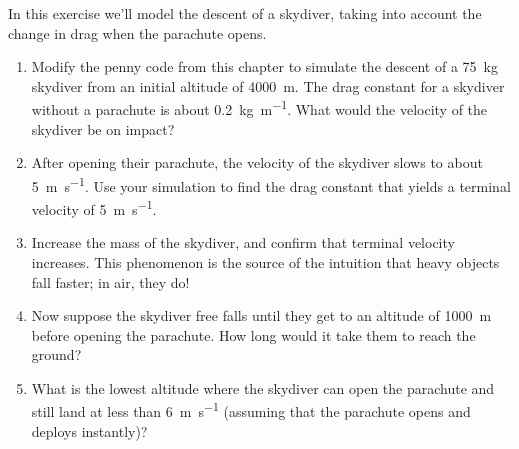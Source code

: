 \documentclass[../../book.tex]{subfiles}
\begin{document}
\begin{ex}

In this exercise we'll model the descent of a skydiver, taking into account the change in drag when the parachute opens.

\begin{enumerate}

\item Modify the penny code from this chapter to simulate the descent of a \SI{75}{\kilogram} skydiver from an initial altitude of \SI{4000}{\meter}.
The drag constant for a skydiver without a parachute is about \SI{0.2}{\kilogram \per \meter}.
What would the velocity of the skydiver be on impact?

\item After opening their parachute, the velocity of the skydiver slows to about \SI{5}{\meter\per\second}.  Use your simulation to find the drag constant that yields a terminal velocity of \SI{5}{\meter\per\second}.

\item Increase the mass of the skydiver, and confirm that terminal velocity increases.  This phenomenon is the source of the intuition that heavy objects fall faster; in air, they do!

\item Now suppose the skydiver free falls until they get to an altitude of \SI{1000}{\meter} before opening the parachute.  How long would it take them to reach the ground?

\item What is the lowest altitude where the skydiver can open the parachute and still land at less than \SI{6}{\meter\per\second} (assuming that the parachute opens and deploys instantly)?

\end{enumerate}


\end{ex}
\end{document}
